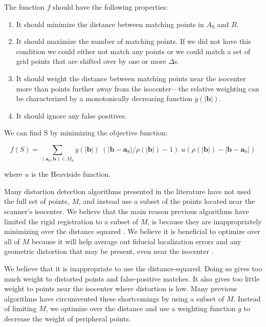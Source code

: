 \documentclass[12pt]{article}
\begin{document}
The function $f$ should have the following properties:

\begin{enumerate}
\item It should minimize the distance between matching points in $A_\mathrm{S}$ and $B$.
\item It should maximize the number of matching points.  If we did not have this condition we could either not match any points or we could match a set of grid points that are shifted over by one or more $\Delta$s.
\item It should weight the distance between matching points near the isocenter more than points further away from the isocenter---the relative weighting can be characterized by a monotonically decreasing function $g(|\mathbf{b}|)$.
\item It should ignore any false positives.
\end{enumerate}

We can find $\mathrm{S}$ by minimizing the objective function:

\begin{equation*}
f(S) =
\sum_{(\textbf{a}_\textrm{S}, \textbf{b}) \in M_\textrm{S}} g(\left|\mathbf{b}\right|)
\;
(\left|\mathbf{b} - \mathbf{a}_\textrm{S}\right|/\rho(|\mathbf{b}|) - 1)
\;
u(\rho(|\mathbf{b}|) - \left|\mathbf{b} - \mathbf{a}_\textrm{S}\right|)
\end{equation*}

where $u$ is the Heaviside function.

Many distortion detection algorithms presented in the literature have not used the full set of points, $M$, and instead use a subset of the points located near the scanner's isocenter.  We believe that the main reason previous algorithms have limited the rigid registration to a subset of $M$, is because they are inappropriately minimizing over the distance squared \cite{wang2005}.  We believe it is beneficial to optimize over all of $M$ because it will help average out fiducial localization errors and any geometric distortion that may be present, even near the isocenter \cite{baldwin2007}.

We believe that it is inappropriate to use the distance-squared.  Doing so gives too much weight to distorted points and false-positive matches.  It also gives too little weight to points near the isocenter where distortion is low.  Many previous algorithms have circumvented these shortcomings by using a subset of $M$.  Instead of limiting $M$, we optimize over the distance and use a weighting function $g$ to decrease the weight of peripheral points.
\end{document}
